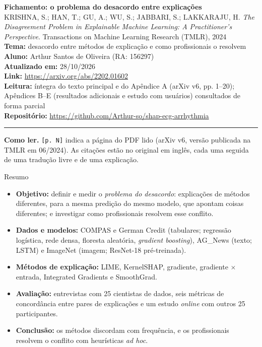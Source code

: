 \documentclass[11pt,a4paper]{article}
\begin{document}
\begin{center}
    {\LARGE \textbf{Fichamento: o problema do desacordo entre explicações}} \\[0.35em]
    {\large KRISHNA, S.; HAN, T.; GU, A.; WU, S.; JABBARI, S.; LAKKARAJU, H. \textit{The Disagreement Problem in Explainable Machine Learning: A Practitioner's Perspective}. Transactions on Machine Learning Research (TMLR), 2024} \\[0.3em]
    \textbf{Tema:} desacordo entre métodos de explicação e como profissionais o resolvem \\[0.2em]
    \textbf{Aluno:} Arthur Santos de Oliveira (RA: 156297) \\[0.2em]
    \textbf{Atualizado em:} 28/10/2026 \\[0.2em]
    \textbf{Link:} \url{https://arxiv.org/abs/2202.01602} \\[0.2em]
    \textbf{Leitura:} íntegra do texto principal e do Apêndice A (arXiv v6, pp. 1--20); Apêndices B--E (resultados adicionais e estudo com usuários) consultados de forma parcial \\[0.2em]
    \textbf{Repositório:} \url{https://github.com/Arthur-so/shap-ecg-arrhythmia}
\end{center}
\vspace{-0.5em}
\hrule
\vspace{0.8em}

\textbf{Como ler.} \texttt{[p. N]} indica a página do PDF lido (arXiv v6, versão publicada na TMLR em 06/2024). As citações estão no original em inglês, cada uma seguida de uma tradução livre e de uma explicação.

\begin{infobox}[note]{Resumo}
\begin{itemize}
  \item \textbf{Objetivo:} definir e medir o \textit{problema do desacordo}: explicações de métodos diferentes, para a mesma predição do mesmo modelo, que apontam coisas diferentes; e investigar como profissionais resolvem esse conflito.
  \item \textbf{Dados e modelos:} COMPAS e German Credit (tabulares; regressão logística, rede densa, floresta aleatória, \textit{gradient boosting}), AG\_News (texto; LSTM) e ImageNet (imagem; ResNet-18 pré-treinada).
  \item \textbf{Métodos de explicação:} LIME, KernelSHAP, gradiente, gradiente $\times$ entrada, Integrated Gradients e SmoothGrad.
  \item \textbf{Avaliação:} entrevistas com 25 cientistas de dados, seis métricas de concordância entre pares de explicações e um estudo \textit{online} com outros 25 participantes.
  \item \textbf{Conclusão:} os métodos discordam com frequência, e os profissionais resolvem o conflito com heurísticas \textit{ad hoc}.
\end{itemize}
\end{infobox}
\end{document}
